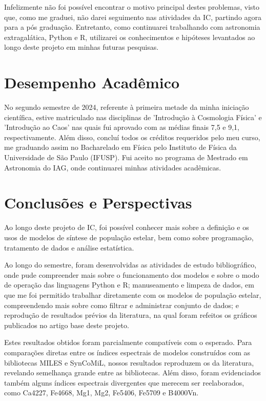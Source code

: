 \documentclass[12pt]{projeto}
\begin{document}
Infelizmente não foi possível encontrar o motivo principal destes problemas, visto que, como me graduei, não darei seguimento nas atividades da IC, partindo agora para a pós graduação. Entretanto, como continuarei trabalhando com astronomia extragalática, Python e R, utilizarei os conhecimentos e hipóteses levantados ao longo deste projeto em minhas futuras pesquisas. 

\section{Desempenho Acadêmico}
No segundo semestre de 2024, referente à primeira metade da minha iniciação científica, estive matriculado nas disciplinas de 'Introdução à Cosmologia Física' e 'Introdução ao Caos' nas quais fui aprovado com as médias finais 7,5 e 9,1, respectivamente. Além disso, concluí todos os créditos requeridos pelo meu curso, me graduando assim no Bacharelado em Física pelo Instituto de Física da Universidade de São Paulo (IFUSP). Fui aceito no programa de Mestrado em Astronomia do IAG, onde continuarei minhas atividades acadêmicas.

\section{Conclusões e Perspectivas}

Ao longo deste projeto de IC, foi possível conhecer mais sobre a definição e os usos de modelos de síntese de população estelar, bem como sobre programação, tratamento de dados e análise estatística.

Ao longo do semestre, foram desenvolvidas as atividades de estudo bibliográfico, onde pude compreender mais sobre o funcionamento dos modelos e sobre o modo de operação das linguagens Python e R; manuseamento e limpeza de dados, em que me foi permitido trabalhar diretamente com os modelos de população estelar, compreendendo mais sobre como filtrar e administrar conjunto de dados; e reprodução de resultados prévios da literatura, na qual foram refeitos os gráficos publicados no artigo base deste projeto.

Estes resultados obtidos foram parcialmente compatíveis com o esperado. Para comparações diretas entre os índices espectrais de modelos construídos com as bibliotecas MILES e SynCoMiL, nossos resultados reproduzem os da literatura, revelando semelhança grande entre as bibliotecas. Além disso, foram evidenciados também alguns índices espectrais divergentes que merecem ser reelaborados, como Ca4227, Fe4668, Mg1, Mg2, Fe5406, Fe5709 e B4000Vn.
\end{document}
